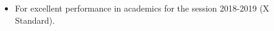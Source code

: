 \documentclass[10pt,a4paper,ragged2e,withhyper]{altacv}
\begin{document}
\begin{paracol}{2}
                \begin{itemize}
                    \item For excellent performance in academics for the session 2018-2019 (X Standard).
                \end{itemize}


        
            

            
    \end{paracol}
\end{document}

